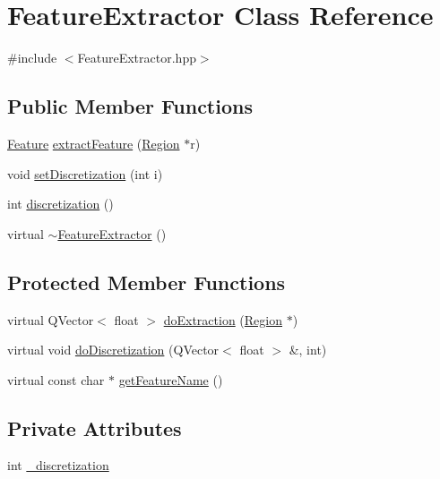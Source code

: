 \hypertarget{class_feature_extractor}{\section{Feature\+Extractor Class Reference}
\label{class_feature_extractor}
}


{\ttfamily \#include $<$Feature\+Extractor.\+hpp$>$}

\subsection*{Public Member Functions}
\begin{DoxyCompactItemize}
\item 
\hyperlink{class_feature}{Feature} \hyperlink{class_feature_extractor_a0bcc371c074b3aa6fa54b75b3657ffb0}{extract\+Feature} (\hyperlink{class_region}{Region} $\ast$r)
\item 
void \hyperlink{class_feature_extractor_a99ef3afd19f932dcb7dbb089e474d41b}{set\+Discretization} (int i)
\item 
int \hyperlink{class_feature_extractor_a1d800b4e5f3af7c758bfc5f157110681}{discretization} ()
\item 
virtual \hyperlink{class_feature_extractor_a6cf7b08d1b50fad5c42bacaa18316f6e}{$\sim$\+Feature\+Extractor} ()
\end{DoxyCompactItemize}
\subsection*{Protected Member Functions}
\begin{DoxyCompactItemize}
\item 
virtual Q\+Vector$<$ float $>$ \hyperlink{class_feature_extractor_af4afca623abc12c0af3572b2189d0825}{do\+Extraction} (\hyperlink{class_region}{Region} $\ast$)
\item 
virtual void \hyperlink{class_feature_extractor_aa72a103a311a391eafdd0916c8ffabce}{do\+Discretization} (Q\+Vector$<$ float $>$ \&, int)
\item 
virtual const char $\ast$ \hyperlink{class_feature_extractor_a12e9b0c683be94146a5c4fbd2d48967f}{get\+Feature\+Name} ()
\end{DoxyCompactItemize}
\subsection*{Private Attributes}
\begin{DoxyCompactItemize}
\item 
int \hyperlink{class_feature_extractor_a76b9438b85a119c2ec4126b75c0486bf}{\+\_\+discretization}
\end{DoxyCompactItemize}


